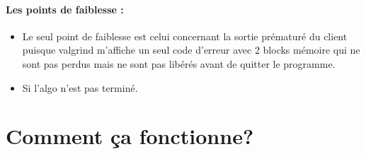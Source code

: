 \documentclass{article}
\begin{document}
\paragraph{\textbf{Les points de faiblesse :}}
\begin{itemize}
\item Le seul point de faiblesse est celui concernant la sortie prématuré du client puisque valgrind m'affiche un seul code d'erreur avec 2 blocks mémoire qui ne sont pas perdus mais ne sont pas libérés avant de quitter le programme.
\item Si l'algo n'est pas terminé.
\end{itemize}

\section{Comment ça fonctionne?}
\end{document}
